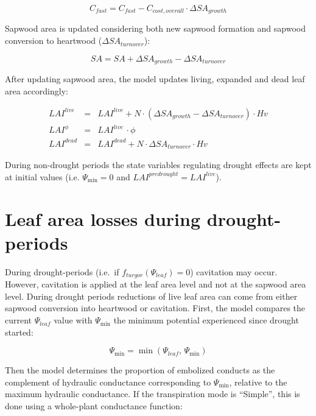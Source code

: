 \documentclass[]{book}
\begin{document}
\begin{equation}
C_{fast} = C_{fast} - C_{cost,overall} \cdot \Delta SA_{growth}
\end{equation}

Sapwood area is updated considering both new sapwood formation and
sapwood conversion to heartwood (\(\Delta SA_{turnover}\)):

\begin{equation}
SA = SA + \Delta SA_{growth} - \Delta SA_{turnover} 
\end{equation}

After updating sapwood area, the model updates living, expanded and dead
leaf area accordingly:

\begin{eqnarray}
LAI^{live} &=& LAI^{live} + N \cdot (\Delta SA_{growth} - \Delta SA_{turnover}) \cdot Hv \\
LAI^{\phi} &=& LAI^{live}\,\cdot\phi \\
LAI^{dead} &=& LAI^{dead} + N \cdot \Delta SA_{turnover} \cdot Hv 
\end{eqnarray}

During non-drought periods the state variables regulating drought
effects are kept at initial values (i.e. \(\Psi_{\min} = 0\) and
\(LAI^{predrought} = LAI^{live}\)).

\section{Leaf area losses during
drought-periods}\label{leaf-area-losses-during-drought-periods}

During drought-periods (i.e.~if \(f_{turgor}(\Psi_{leaf})=0\))
cavitation may occur. However, cavitation is applied at the leaf area
level and not at the sapwood area level. During drought periods
reductions of live leaf area can come from either sapwood conversion
into heartwood or cavitation. First, the model compares the current
\(\Psi_{leaf}\) value with \(\Psi_{\min}\) the minimum potential
experienced since drought started:

\begin{equation}
\Psi_{\min} = \min(\Psi_{leaf}, \, \Psi_{\min})
\end{equation}

Then the model determines the proportion of embolized conducts as the
complement of hydraulic conductance corresponding to \(\Psi_{\min}\),
relative to the maximum hydraulic conductance. If the transpiration mode
is ``Simple'', this is done using a whole-plant conductance function:
\end{document}
